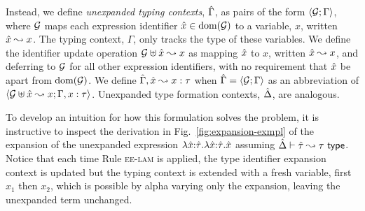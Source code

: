 \documentclass[acmsmall,screen]{acmart}
\begin{document}
Instead, we define \emph{unexpanded typing contexts}, $\hat{\Gamma}$, as pairs of the form $\langle \mathcal{G}; \Gamma \rangle$, where $\mathcal{G}$ maps each expression identifier ${\hat x} \in \text{dom}(\mathcal{G})$ to a variable, $x$, written ${\hat x} \leadsto x$. The typing context, $\Gamma$, only tracks the type of these variables. We define the identifier update operation $\mathcal{G} \uplus {\hat x} \leadsto x$ as mapping ${\hat x}$ to $x$, written ${\hat x} \leadsto x$, and deferring to $\mathcal{G}$ for all other expression identifiers, with no requirement that ${\hat x}$ be apart from $\text{dom}(\mathcal{G})$. %
We define $\hat{\Gamma}, {\hat x} \leadsto x : \tau$ when $\hat{\Gamma} = \langle \mathcal{G}; \Gamma \rangle$ as an abbreviation of $\langle \mathcal{G} \uplus {\hat x} \leadsto x; \Gamma, x : \tau \rangle$. Unexpanded type formation contexts, $\hat{\Delta}$, are analogous. 

To develop an intuition for how this formulation solves the problem, it is instructive to inspect the derivation in Fig.~\ref{fig:expansion-exmpl} of the expansion of the unexpanded expression $\lambda {\hat x}{:}{\hat\tau}.\lambda {\hat x}{:}{\hat\tau}.{\hat x}$ assuming $\hat{\Delta} \vdash {\hat\tau} \leadsto \tau~\mathsf{type}$. Notice that each time Rule \textsc{ee-lam} is applied, the type identifier expansion context is updated but the typing context is extended with a fresh variable, first $x_1$ then $x_2$, which is possible by alpha varying only the expansion, leaving the unexpanded term unchanged. %

\end{document}
